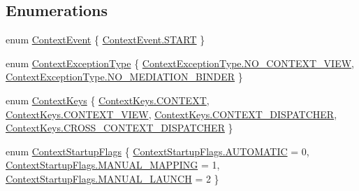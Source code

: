 \subsection*{Enumerations}
\begin{DoxyCompactItemize}
\item 
enum \hyperlink{namespacestrange_1_1extensions_1_1context_1_1api_a92a831a11b0bd5ee051b35745b33791a}{Context\-Event} \{ \hyperlink{namespacestrange_1_1extensions_1_1context_1_1api_a92a831a11b0bd5ee051b35745b33791aab078ffd28db767c502ac367053f6e0ac}{Context\-Event.\-S\-T\-A\-R\-T}
 \}
\item 
enum \hyperlink{namespacestrange_1_1extensions_1_1context_1_1api_a60b937d6295cc72fe4b26e4f9d671283}{Context\-Exception\-Type} \{ \hyperlink{namespacestrange_1_1extensions_1_1context_1_1api_a60b937d6295cc72fe4b26e4f9d671283ac6443b3577afe97292f19a0f2b0b4d89}{Context\-Exception\-Type.\-N\-O\-\_\-\-C\-O\-N\-T\-E\-X\-T\-\_\-\-V\-I\-E\-W}, 
\hyperlink{namespacestrange_1_1extensions_1_1context_1_1api_a60b937d6295cc72fe4b26e4f9d671283a0e2fd9683c004efce35e8c0113667bba}{Context\-Exception\-Type.\-N\-O\-\_\-\-M\-E\-D\-I\-A\-T\-I\-O\-N\-\_\-\-B\-I\-N\-D\-E\-R}
 \}
\item 
enum \hyperlink{namespacestrange_1_1extensions_1_1context_1_1api_a64d630fc6451680225841051a568f4d6}{Context\-Keys} \{ \hyperlink{namespacestrange_1_1extensions_1_1context_1_1api_a64d630fc6451680225841051a568f4d6a03dcdeb793b893c48eda7952aac3c03c}{Context\-Keys.\-C\-O\-N\-T\-E\-X\-T}, 
\hyperlink{namespacestrange_1_1extensions_1_1context_1_1api_a64d630fc6451680225841051a568f4d6a160006392e2747e6b3e5f663a9e1b953}{Context\-Keys.\-C\-O\-N\-T\-E\-X\-T\-\_\-\-V\-I\-E\-W}, 
\hyperlink{namespacestrange_1_1extensions_1_1context_1_1api_a64d630fc6451680225841051a568f4d6aee8b94342ad445619c9959a6745bd3c1}{Context\-Keys.\-C\-O\-N\-T\-E\-X\-T\-\_\-\-D\-I\-S\-P\-A\-T\-C\-H\-E\-R}, 
\hyperlink{namespacestrange_1_1extensions_1_1context_1_1api_a64d630fc6451680225841051a568f4d6a500faa82c964b0f9d1fd9b236b7e8901}{Context\-Keys.\-C\-R\-O\-S\-S\-\_\-\-C\-O\-N\-T\-E\-X\-T\-\_\-\-D\-I\-S\-P\-A\-T\-C\-H\-E\-R}
 \}
\item 
enum \hyperlink{namespacestrange_1_1extensions_1_1context_1_1api_a6e67a548377c1491bddc3a81c0f312c5}{Context\-Startup\-Flags} \{ \hyperlink{namespacestrange_1_1extensions_1_1context_1_1api_a6e67a548377c1491bddc3a81c0f312c5a008f6cdd0c190839e9885cf9f9e2a652}{Context\-Startup\-Flags.\-A\-U\-T\-O\-M\-A\-T\-I\-C} = 0, 
\hyperlink{namespacestrange_1_1extensions_1_1context_1_1api_a6e67a548377c1491bddc3a81c0f312c5a0655aa3c508789a8f33bd843480bdcd6}{Context\-Startup\-Flags.\-M\-A\-N\-U\-A\-L\-\_\-\-M\-A\-P\-P\-I\-N\-G} = 1, 
\hyperlink{namespacestrange_1_1extensions_1_1context_1_1api_a6e67a548377c1491bddc3a81c0f312c5ac0b394b3f25a79cf770ae19192343bcd}{Context\-Startup\-Flags.\-M\-A\-N\-U\-A\-L\-\_\-\-L\-A\-U\-N\-C\-H} = 2
 \}
\end{DoxyCompactItemize}


